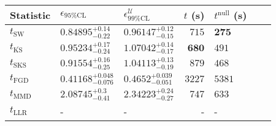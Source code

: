 \begin{tabular}{l|llr|llr}
	Statistic & $\epsilon_{95\%\mathrm{CL}}$ & $\epsilon^    {\mathcal{U}}_{99\%\mathrm{CL}}$ & $t$ (s) & $t^{\mathrm{null}}$ (s) \\
	\midrule
	$t_{\mathrm{SW}}$ & $0.84895_{-0.22}^{+0.14}$ & $0.96147_{-0.15}^{+0.12}$ & $715$ & ${\mathbf{275}}$ \\
	$t_{\overline{\mathrm{KS}}}$ & $0.95234_{-0.24}^{+0.17}$ & $1.07042_{-0.17}^{+0.14}$ & ${\mathbf{680}}$ & $491$ \\
	$t_{\mathrm{SKS}}$ & $0.91554_{-0.25}^{+0.16}$ & $1.04113_{-0.19}^{+0.13}$ & $879$ & $468$ \\
	$t_{\mathrm{FGD}}$ & ${\mathbf{0.41168_{-0.076}^{+0.048}}}$ & ${\mathbf{0.4652_{-0.051}^{+0.039}}}$ & $3227$ & $5381$ \\
	$t_{\mathrm{MMD}}$ & $2.08745_{-0.41}^{+0.3}$ & $2.34223_{-0.27}^{+0.24}$ & $747$ & $633$ \\
	$t_{\mathrm{LLR}}$ & - & - & - & - \\
	\bottomrule
\end{tabular}